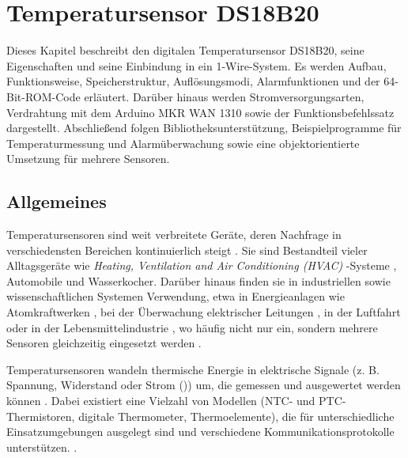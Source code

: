 %
%

\chapter{Temperatursensor DS18B20}
	Dieses Kapitel beschreibt den digitalen Temperatursensor DS18B20, seine Eigenschaften und seine Einbindung in ein 1-Wire-System. Es werden Aufbau, Funktionsweise, Speicherstruktur, Auflösungsmodi, Alarmfunktionen und der 64-Bit-ROM-Code erläutert. Darüber hinaus werden Stromversorgungsarten, Verdrahtung mit dem Arduino MKR WAN 1310 sowie der Funktionsbefehlssatz dargestellt. Abschlie{\ss}end folgen Bibliotheksunterstützung, Beispielprogramme für Temperaturmessung und Alarmüberwachung sowie eine objektorientierte Umsetzung für mehrere Sensoren.
	
\section{Allgemeines}
Temperatursensoren sind weit verbreitete Geräte, deren Nachfrage in verschiedensten Bereichen kontinuierlich steigt \cite{MAM:2025}. Sie sind Bestandteil vieler Alltagsgeräte wie \textit{Heating, Ventilation and Air Conditioning (HVAC)} -Systeme \cite{Shinoda:2021}, Automobile \cite{Zun:2011} und Wasserkocher. Darüber hinaus finden sie in industriellen sowie wissenschaftlichen Systemen Verwendung, etwa in Energieanlagen wie Atomkraftwerken \cite{Hashemian:2009}, bei der Überwachung elektrischer Leitungen \cite{Navarrete:2025}, in der Luftfahrt \cite{Zhang:2024} oder in der Lebensmittelindustrie \cite{Wan:2024}, wo häufig nicht nur ein, sondern mehrere Sensoren gleichzeitig eingesetzt werden \cite{Lin:2002}.

Temperatursensoren wandeln thermische Energie in elektrische Signale (z. B. Spannung, Widerstand oder Strom (\cite[3]{Fraden:2010})) um, die gemessen und ausgewertet werden können \cite[519 -- 520]{Fraden:2010}. Dabei existiert eine Vielzahl von Modellen (NTC- und PTC-Thermistoren, digitale Thermometer, Thermoelemente), die für unterschiedliche Einsatzumgebungen ausgelegt sind und verschiedene Kommunikationsprotokolle unterstützen. \cite[1]{Elyounsi:2021}.
	


